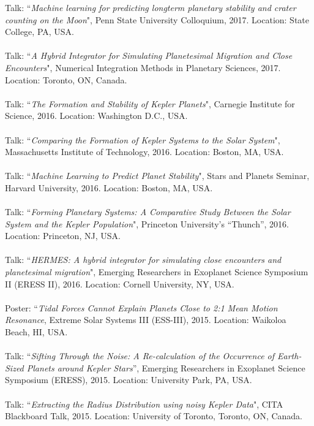 \documentclass[10pt]{res} %
\begin{document}
\begin{resume}
\vspace{8pt} %
Talk: ``{\sl Machine learning for predicting longterm planetary stability and crater counting on the Moon}", Penn State University Colloquium, 2017. Location: State College, PA, USA. \\ \\
Talk: ``{\sl A Hybrid Integrator for Simulating Planetesimal Migration and Close Encounters}", Numerical Integration Methods in Planetary Sciences, 2017. Location: Toronto, ON, Canada. \\ \\
Talk: ``{\sl The Formation and Stability of Kepler Planets}", Carnegie Institute for Science, 2016. Location: Washington D.C., USA. \\ \\
Talk: ``{\sl Comparing the Formation of Kepler Systems to the Solar System}", Massachusetts Institute of Technology, 2016. Location: Boston, MA, USA. \\ \\
Talk: ``{\sl Machine Learning to Predict Planet Stability}", Stars and Planets Seminar, Harvard University, 2016. Location: Boston, MA, USA. \\ \\
Talk: ``{\sl Forming Planetary Systems: A Comparative Study Between the Solar System and the Kepler Population}", Princeton University's ``Thunch'', 2016. Location: Princeton, NJ, USA. \\ \\
Talk: ``{\sl HERMES: A hybrid integrator for simulating close encounters and planetesimal migration}", Emerging Researchers in Exoplanet Science Symposium II (ERESS II), 2016. Location: Cornell University, NY, USA. \\ \\
Poster: ``{\sl Tidal Forces Cannot Explain Planets Close to 2:1 Mean Motion Resonance}, Extreme Solar Systems III (ESS-III), 2015. Location: Waikoloa Beach, HI, USA. \\ \\
Talk: ``{\sl Sifting Through the Noise: A Re-calculation of the Occurrence of Earth-Sized Planets around Kepler Stars}'', Emerging Researchers in Exoplanet Science Symposium (ERESS), 2015. Location: University Park, PA, USA. \\ \\
Talk: ``{\sl Extracting the Radius Distribution using noisy Kepler Data}", CITA Blackboard Talk, 2015. Location: University of Toronto, Toronto, ON, Canada. 


\end{resume}
\end{document}
